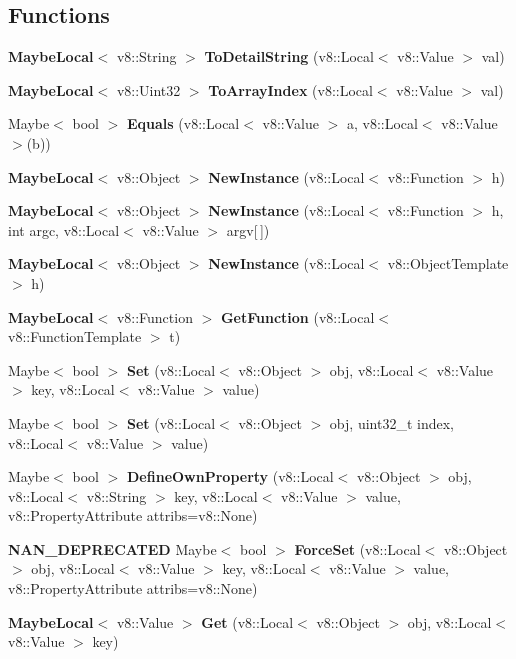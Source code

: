 \subsection*{Functions}
\begin{DoxyCompactItemize}
\item 
\textbf{ Maybe\+Local}$<$ v8\+::\+String $>$ \textbf{ To\+Detail\+String} (v8\+::\+Local$<$ v8\+::\+Value $>$ val)
\item 
\textbf{ Maybe\+Local}$<$ v8\+::\+Uint32 $>$ \textbf{ To\+Array\+Index} (v8\+::\+Local$<$ v8\+::\+Value $>$ val)
\item 
Maybe$<$ bool $>$ \textbf{ Equals} (v8\+::\+Local$<$ v8\+::\+Value $>$ a, v8\+::\+Local$<$ v8\+::\+Value $>$(b))
\item 
\textbf{ Maybe\+Local}$<$ v8\+::\+Object $>$ \textbf{ New\+Instance} (v8\+::\+Local$<$ v8\+::\+Function $>$ h)
\item 
\textbf{ Maybe\+Local}$<$ v8\+::\+Object $>$ \textbf{ New\+Instance} (v8\+::\+Local$<$ v8\+::\+Function $>$ h, int argc, v8\+::\+Local$<$ v8\+::\+Value $>$ argv[$\,$])
\item 
\textbf{ Maybe\+Local}$<$ v8\+::\+Object $>$ \textbf{ New\+Instance} (v8\+::\+Local$<$ v8\+::\+Object\+Template $>$ h)
\item 
\textbf{ Maybe\+Local}$<$ v8\+::\+Function $>$ \textbf{ Get\+Function} (v8\+::\+Local$<$ v8\+::\+Function\+Template $>$ t)
\item 
Maybe$<$ bool $>$ \textbf{ Set} (v8\+::\+Local$<$ v8\+::\+Object $>$ obj, v8\+::\+Local$<$ v8\+::\+Value $>$ key, v8\+::\+Local$<$ v8\+::\+Value $>$ value)
\item 
Maybe$<$ bool $>$ \textbf{ Set} (v8\+::\+Local$<$ v8\+::\+Object $>$ obj, uint32\+\_\+t index, v8\+::\+Local$<$ v8\+::\+Value $>$ value)
\item 
Maybe$<$ bool $>$ \textbf{ Define\+Own\+Property} (v8\+::\+Local$<$ v8\+::\+Object $>$ obj, v8\+::\+Local$<$ v8\+::\+String $>$ key, v8\+::\+Local$<$ v8\+::\+Value $>$ value, v8\+::\+Property\+Attribute attribs=v8\+::\+None)
\item 
\textbf{ N\+A\+N\+\_\+\+D\+E\+P\+R\+E\+C\+A\+T\+ED} Maybe$<$ bool $>$ \textbf{ Force\+Set} (v8\+::\+Local$<$ v8\+::\+Object $>$ obj, v8\+::\+Local$<$ v8\+::\+Value $>$ key, v8\+::\+Local$<$ v8\+::\+Value $>$ value, v8\+::\+Property\+Attribute attribs=v8\+::\+None)
\item 
\textbf{ Maybe\+Local}$<$ v8\+::\+Value $>$ \textbf{ Get} (v8\+::\+Local$<$ v8\+::\+Object $>$ obj, v8\+::\+Local$<$ v8\+::\+Value $>$ key)

\end{DoxyCompactItemize}
